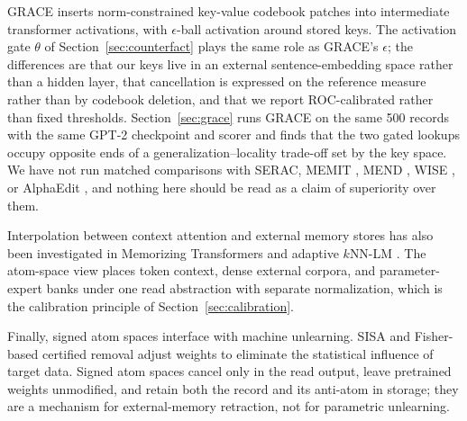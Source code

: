\documentclass[preprint,12pt]{elsarticle}
\begin{document}
GRACE \cite{hartvigsen2023aging} inserts norm-constrained key-value codebook patches into intermediate transformer activations, with $\epsilon$-ball activation around stored keys. The activation gate $\theta$ of Section~\ref{sec:counterfact} plays the same role as GRACE's $\epsilon$; the differences are that our keys live in an external sentence-embedding space rather than a hidden layer, that cancellation is expressed on the reference measure rather than by codebook deletion, and that we report ROC-calibrated rather than fixed thresholds. Section~\ref{sec:grace} runs GRACE on the same 500 records with the same GPT-2 checkpoint and scorer and finds that the two gated lookups occupy opposite ends of a generalization--locality trade-off set by the key space. We have not run matched comparisons with SERAC, MEMIT \cite{meng2023mass}, MEND \cite{mitchell2022fast}, WISE \cite{wang2024wise}, or AlphaEdit \cite{fang2025alphaedit}, and nothing here should be read as a claim of superiority over them.

Interpolation between context attention and external memory stores has also been investigated in Memorizing Transformers \cite{wu2022memorizing} and adaptive $k$NN-LM \cite{he2021efficient}. The atom-space view places token context, dense external corpora, and parameter-expert banks under one read abstraction with separate normalization, which is the calibration principle of Section~\ref{sec:calibration}.

Finally, signed atom spaces interface with machine unlearning. SISA \cite{bourtoule2021machine} and Fisher-based certified removal adjust weights to eliminate the statistical influence of target data. Signed atom spaces cancel only in the read output, leave pretrained weights unmodified, and retain both the record and its anti-atom in storage; they are a mechanism for external-memory retraction, not for parametric unlearning.
\end{document}
